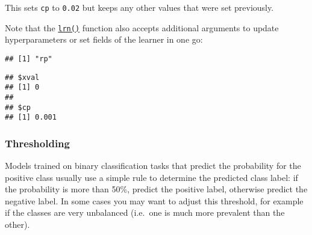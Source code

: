 \documentclass[
]{scrbook}
\newenvironment{Shaded}{\begin{snugshade}}{\end{snugshade}}
\newcommand{\AttributeTok}[1]{\textcolor[rgb]{0.77,0.63,0.00}{#1}}
\newcommand{\FloatTok}[1]{\textcolor[rgb]{0.00,0.00,0.81}{#1}}
\newcommand{\FunctionTok}[1]{\textcolor[rgb]{0.00,0.00,0.00}{#1}}
\newcommand{\NormalTok}[1]{#1}
\newcommand{\OtherTok}[1]{\textcolor[rgb]{0.56,0.35,0.01}{#1}}
\newcommand{\SpecialCharTok}[1]{\textcolor[rgb]{0.00,0.00,0.00}{#1}}
\newcommand{\StringTok}[1]{\textcolor[rgb]{0.31,0.60,0.02}{#1}}
\renewenvironment{Shaded} {\begin{snugshade}\small} {\end{snugshade}}
\begin{document}
\begin{Shaded}
\end{Shaded}

This sets \texttt{cp} to \texttt{0.02} but keeps any other values that were set previously.

Note that the \href{https://mlr3.mlr-org.com/reference/mlr_sugar.html}{\texttt{lrn()}} function also accepts additional arguments to update hyperparameters or set fields of the learner in one go:

\begin{Shaded}
\end{Shaded}

\begin{verbatim}
## [1] "rp"
\end{verbatim}

\begin{Shaded}
\end{Shaded}

\begin{verbatim}
## $xval
## [1] 0
## 
## $cp
## [1] 0.001
\end{verbatim}

\hypertarget{thresholding}{%
\subsubsection{Thresholding}\label{thresholding}}

Models trained on binary classification tasks that predict the probability for the positive class usually use a simple rule to determine the predicted class label: if the probability is more than 50\%, predict the positive label, otherwise predict the negative label.
In some cases you may want to adjust this threshold, for example if the classes are very unbalanced (i.e.~one is much more prevalent than the other).
\end{document}
